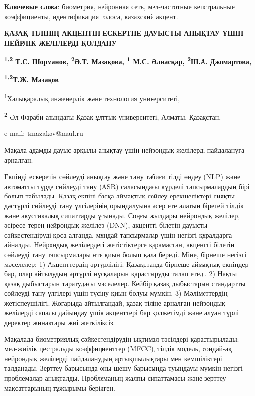 {\bfseries Ключевые слова}: биометрия, нейронная сеть, мел-частотные
кепстральные коэффициенты, идентификация голоса, казахский акцент.

{\bfseries ҚАЗАҚ ТІЛІНІҢ АКЦЕНТІН ЕСКЕРТПЕ ДАУЫСТЫ АНЫҚТАУ ҮШІН НЕЙРЛІК
ЖЕЛІЛЕРДІ ҚОЛДАНУ}

{\bfseries \textsuperscript{1,2} Т.С. Шорманов, \textsuperscript{2}Ә.Т.
Мазақова, \textsuperscript{1} М.С. Әлиасқар, \textsuperscript{2}Ш.А.
Джомартова,}

{\bfseries \textsuperscript{1,2}Т.Ж. Мазақов\textsuperscript{\envelope }}

\textsuperscript{1}Халықаралық инженерлік және технология университеті,

{\bfseries \textsuperscript{2}} Әл-Фараби атындағы Қазақ ұлттық
университеті, Алматы, Қазақстан,

e-mail: tmazakov@mail.ru

Мақала адамды дауыс арқылы анықтау үшін нейрондық желілерді пайдалануға
арналған.

Екпінді ескеретін сөйлеуді анықтау және тану табиғи тілді өңдеу (NLP)
және автоматты түрде сөйлеуді тану (ASR) саласындағы күрделі
тапсырмалардың бірі болып табылады. Қазақ екпіні басқа аймақтық сөйлеу
ерекшеліктері сияқты дәстүрлі сөйлеуді тану үлгілерінің орындалуына әсер
ете алатын бірегей тілдік және акустикалық сипаттарды ұсынады. Соңғы
жылдары нейрондық желілер, әсіресе терең нейрондық желілер (DNN),
акцентті білетін дауысты сәйкестендіруді қоса алғанда, мұндай
тапсырмалар үшін негізгі құралдарға айналды. Нейрондық желілердегі
жетістіктерге қарамастан, акцентті білетін сөйлеуді тану тапсырмалары
өте қиын болып қала береді. Міне, бірнеше негізгі мәселелер: 1)
Акценттердің әртүрлілігі. Қазақстанда бірнеше аймақтық екпіндер бар,
олар айтылудың әртүрлі нұсқаларын қарастыруды талап етеді. 2) Нақты
қазақ дыбыстарын таратудағы мәселелер. Кейбір қазақ дыбыстарын
стандартты сөйлеуді тану үлгілері үшін түсіну қиын болуы мүмкін. 3)
Мәліметтердің жетіспеушілігі. Жоғарыда айтылғандай, қазақ тіліне
арналған нейрондық желілерді сапалы дайындау үшін акценттері бар
қолжетімді және алуан түрлі деректер жинақтары жиі жеткіліксіз.

Мақалада биометриялық сәйкестендірудің ықтимал тәсілдері қарастырылады:
мел-жиілік цестральды коэффициенттер (MFCC), тілдік модель, сондай-ақ
нейрондық желілерді пайдаланудың артықшылықтары мен кемшіліктері
талданады. Зерттеу барысында оны шешу барысында туындауы мүмкін негізгі
проблемалар анықталды. Проблеманың жалпы сипаттамасы және зерттеу
мақсаттарының тұжырымы берілген.

